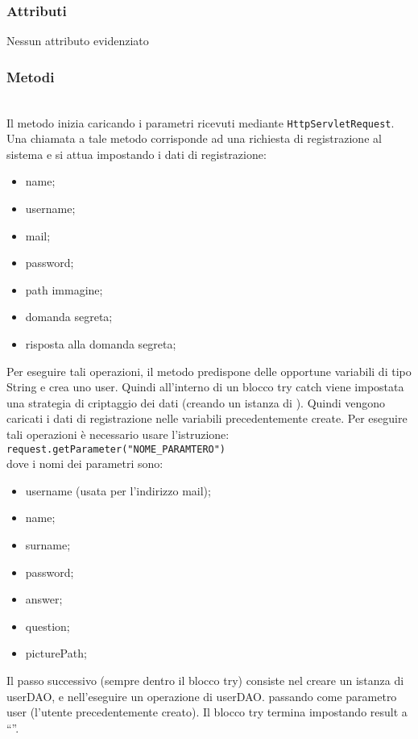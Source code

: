 \subsubsection*{Attributi}

Nessun attributo evidenziato

\subsubsection*{Metodi}
\begin{description}
	\item{}\\

Il metodo inizia caricando i parametri ricevuti mediante \texttt{HttpServletRequest}. Una chiamata a tale metodo corrisponde ad una richiesta di registrazione al sistema e si attua impostando i dati di registrazione:
	\begin{itemize}
		\item name;
		\item username;
		\item mail;
		\item password;
		\item path immagine;
		\item domanda segreta;
		\item risposta alla domanda segreta;
	\end{itemize}
	Per eseguire tali operazioni, il metodo predispone delle opportune variabili di tipo String e crea uno  user. Quindi all'interno di un blocco try catch viene impostata una strategia di criptaggio dei dati (creando un istanza di ). Quindi vengono caricati i dati di registrazione nelle variabili precedentemente create. Per eseguire tali operazioni è necessario usare l'istruzione:\\
	
	\verb|request.getParameter("NOME_PARAMTERO")|\\
	
	dove i nomi dei parametri sono:
	\begin{itemize}
		\item username (usata per l'indirizzo mail);
		\item name;
		\item surname;
		\item password;
		\item answer;
		\item question;
		\item picturePath;
	\end{itemize}
	Il passo successivo (sempre dentro il blocco try) consiste nel creare un istanza di  userDAO, e nell'eseguire un operazione di userDAO. passando come parametro user (l'utente precedentemente creato). Il blocco try termina impostando result a ``''.
	

\end{description}
